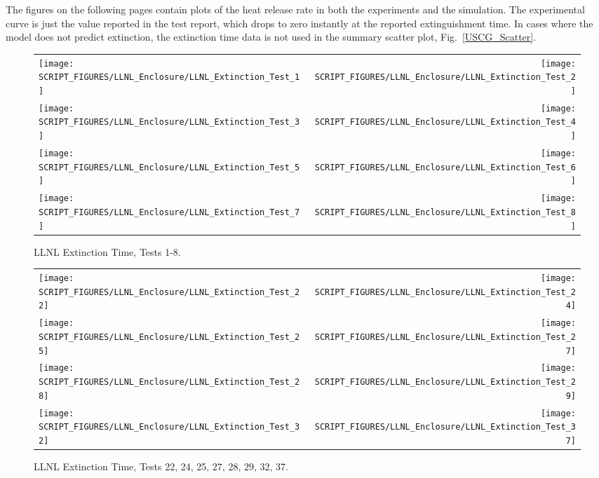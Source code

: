 The figures on the following pages contain plots of the heat release rate in both the experiments and the simulation. The experimental curve is just the value reported in the test report, which drops to zero instantly at the reported extinguishment time. In cases where the model does not predict extinction, the extinction time data is not used in the summary scatter plot, Fig.~\ref{USCG_Scatter}.

\newpage

\begin{figure}[p]
\begin{tabular*}{\textwidth}{l@{\extracolsep{\fill}}r}
\texttt{[image: SCRIPT\_FIGURES/LLNL\_Enclosure/LLNL\_Extinction\_Test\_1]} &
\texttt{[image: SCRIPT\_FIGURES/LLNL\_Enclosure/LLNL\_Extinction\_Test\_2]} \\
\texttt{[image: SCRIPT\_FIGURES/LLNL\_Enclosure/LLNL\_Extinction\_Test\_3]} &
\texttt{[image: SCRIPT\_FIGURES/LLNL\_Enclosure/LLNL\_Extinction\_Test\_4]} \\
\texttt{[image: SCRIPT\_FIGURES/LLNL\_Enclosure/LLNL\_Extinction\_Test\_5]} &
\texttt{[image: SCRIPT\_FIGURES/LLNL\_Enclosure/LLNL\_Extinction\_Test\_6]} \\
\texttt{[image: SCRIPT\_FIGURES/LLNL\_Enclosure/LLNL\_Extinction\_Test\_7]} &
\texttt{[image: SCRIPT\_FIGURES/LLNL\_Enclosure/LLNL\_Extinction\_Test\_8]}
\end{tabular*}
\caption{LLNL Extinction Time, Tests 1-8.}
\label{LLNL_Extinction_1}
\end{figure}

\begin{figure}[p]
\begin{tabular*}{\textwidth}{l@{\extracolsep{\fill}}r}
\texttt{[image: SCRIPT\_FIGURES/LLNL\_Enclosure/LLNL\_Extinction\_Test\_22]} &
\texttt{[image: SCRIPT\_FIGURES/LLNL\_Enclosure/LLNL\_Extinction\_Test\_24]} \\
\texttt{[image: SCRIPT\_FIGURES/LLNL\_Enclosure/LLNL\_Extinction\_Test\_25]} &
\texttt{[image: SCRIPT\_FIGURES/LLNL\_Enclosure/LLNL\_Extinction\_Test\_27]} \\
\texttt{[image: SCRIPT\_FIGURES/LLNL\_Enclosure/LLNL\_Extinction\_Test\_28]} &
\texttt{[image: SCRIPT\_FIGURES/LLNL\_Enclosure/LLNL\_Extinction\_Test\_29]} \\
\texttt{[image: SCRIPT\_FIGURES/LLNL\_Enclosure/LLNL\_Extinction\_Test\_32]} &
\texttt{[image: SCRIPT\_FIGURES/LLNL\_Enclosure/LLNL\_Extinction\_Test\_37]}
\end{tabular*}
\caption{LLNL Extinction Time, Tests 22, 24, 25, 27, 28, 29, 32, 37.}
\label{LLNL_Extinction_2}
\end{figure}

